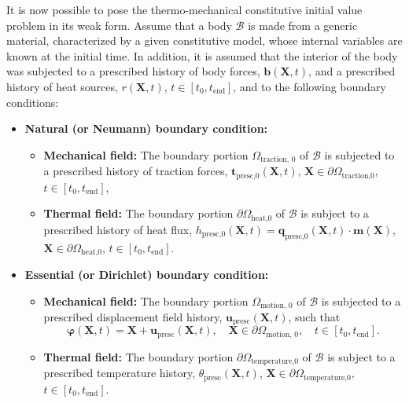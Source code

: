 It is now possible to pose the thermo-mechanical constitutive initial value problem in its weak form.
Assume that a body $\mathscr{B}$ is made from a generic material, characterized by a given constitutive model, whose internal variables are known at the initial time.
In addition, it is assumed that the interior of the body was subjected to a prescribed history of body forces, $\bm b(\bm X, t)$, and a prescribed history of heat sources, $r(\bm X,t)$, $t\in[t_0, t_\text{end}]$, and to the following boundary conditions:
\begin{itemize}
    \item \textbf{Natural (or Neumann) boundary condition:}
    \begin{itemize}
      \item \textbf{Mechanical field:} The boundary portion $\Omega_\text{traction, 0}$ of $\mathscr{B}$ is subjected to a prescribed history of traction forces, $\bm t_\text{presc,0}(\bm X, t)$, $\bm X\in \partial \Omega_\text{traction,0}$, $t\in[t_0, t_\text{end}]$,\\
      \item \textbf{Thermal field:} The boundary portion \(\partial \Omega_\text{heat,0}\) of \(\mathcal B\) is subject to a prescribed history of heat flux, \(h_\text{presc,0}(\bm X, t) = \bm q_\text{presc,0}(\bm X, t)\cdot \bm m(\bm X)\), \(\bm X \in \partial \Omega_\text{heat,0}\), \(t\in [t_0,t_\text{end}]\).
    \end{itemize}
    \item \textbf{Essential (or Dirichlet) boundary condition:}
    \begin{itemize}
      \item \textbf{Mechanical field:} The boundary portion $\Omega_\text{motion, 0}$ of $\mathscr{B}$ is subjected to a prescribed displacement field history, $\bm u_\text{presc}(\bm X, t)$, such that $$\bm \varphi(\bm X, t) = \bm X + \bm u_\text{presc}(\bm X, t),\quad \bm X\in \partial\Omega_\text{motion, 0},\quad t\in[t_0, t_\text{end}].$$
      \item \textbf{Thermal field:} The boundary portion \(\partial \Omega_\text{temperature,0}\) of \(\mathcal B\) is subject to a prescribed temperature history, \(\theta_\text{presc}(\bm X, t)\), \(\bm X \in \partial \Omega_\text{temperature,0}\), \(t\in [t_0,t_\text{end}]\).
    \end{itemize}
\end{itemize}

